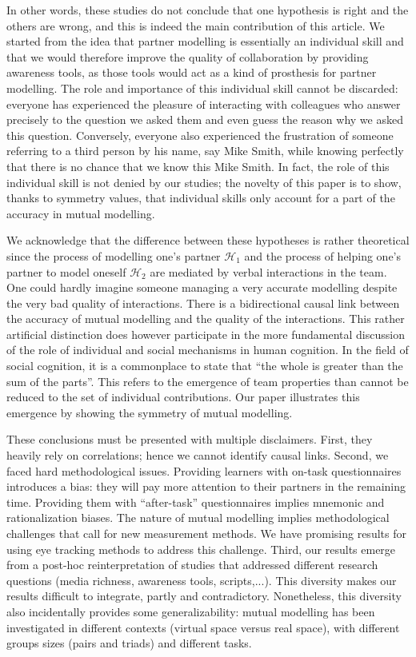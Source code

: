 \documentclass[natbib]{svjour3}
\begin{document}
In other words, these studies do not conclude that one hypothesis is right and the
others are wrong, and this is indeed the main contribution of this article. We
started from the idea that partner modelling is essentially an individual skill
and that we would therefore improve the quality of collaboration by providing 
awareness tools, as those tools would act as a kind of prosthesis for partner
modelling. The role and importance of this individual skill cannot be discarded:
everyone has experienced the pleasure of interacting with colleagues who answer precisely to the question
we asked them and even guess the reason why we asked this question. Conversely,
everyone also experienced the frustration of someone referring to a third
person by his name, say Mike Smith, while knowing perfectly that there is no
chance that we know this Mike Smith. In fact, the role of this individual skill is
not denied by our studies; the novelty of this paper is to show, thanks to
symmetry values, that individual skills only account for a part of the accuracy
in mutual modelling.

We acknowledge that the difference between these hypotheses is rather
theoretical since the  process of modelling one's partner $\mathcal{H}_{1}$ and
the process of helping one's partner to model oneself $\mathcal{H}_{2}$ are
mediated by verbal interactions in the team. One could hardly imagine someone
managing a very accurate modelling despite the very bad quality of interactions.
There is a bidirectional causal link between the accuracy of mutual modelling
and the quality of the interactions. This rather artificial distinction does
however participate in the more fundamental discussion of the role of individual
and social mechanisms in human cognition. In the field of social cognition, it
is a commonplace to state that ``the whole is greater than the sum of the
parts''.  This refers to the emergence of team properties than cannot be reduced
to the set of individual contributions. Our paper illustrates this emergence by
showing the symmetry of mutual modelling.


These conclusions must be presented with multiple disclaimers. First, they
heavily rely on correlations; hence we cannot identify causal links. Second, we
faced hard methodological issues. Providing learners with on-task questionnaires
introduces a bias: they will pay more attention to their partners in the
remaining time. Providing them with ``after-task'' questionnaires implies
mnemonic and rationalization biases. The nature of mutual modelling implies
methodological challenges that call for new measurement methods. We have
promising results for using eye tracking methods to address this challenge.
Third, our results emerge from a post-hoc reinterpretation of studies that
addressed different research questions (media richness, awareness tools,
scripts,...). This diversity makes our results difficult to integrate, partly
and contradictory. Nonetheless, this diversity also incidentally provides some
generalizability: mutual modelling has been investigated in different contexts
(virtual space versus real space), with different groups sizes (pairs and
triads) and different tasks.
\end{document}
